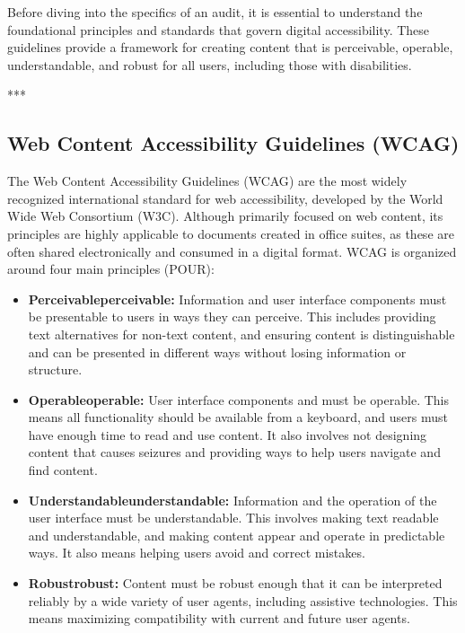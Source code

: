 Before diving into the specifics of an audit, it is essential to understand the foundational principles and standards that govern digital accessibility. These guidelines provide a framework for creating content that is perceivable, operable, understandable, and robust for all users, including those with disabilities.

***

\subsection{Web Content Accessibility Guidelines (WCAG)}
\label{sub:web-content-accessibility-guidelines-wcag}

The Web Content Accessibility Guidelines (\gls{WCAG}) are the most widely recognized international standard for web accessibility, developed by the World Wide Web Consortium (W3C). Although primarily focused on web content, its principles are highly applicable to documents created in office suites, as these are often shared electronically and consumed in a digital format. \gls{WCAG} is organized around four main principles (POUR)\supercite{WCAGGuidelines}:

\begin{itemize}
	\item \textbf{Perceivable\gls{perceivable}:} Information and user interface components must be presentable to users in ways they can perceive. This includes providing text alternatives for non-text content, and ensuring content is distinguishable and can be presented in different ways without losing information or structure.
	\item \textbf{Operable\gls{operable}:} User interface components and  must be operable. This means all functionality should be available from a keyboard, and users must have enough time to read and use content. It also involves not designing content that causes seizures and providing ways to help users navigate and find content.
	\item \textbf{Understandable\gls{understandable}:} Information and the operation of the user interface must be understandable. This involves making text readable and understandable, and making content appear and operate in predictable ways. It also means helping users avoid and correct mistakes.
	\item \textbf{Robust\gls{robust}:} Content must be robust enough that it can be interpreted reliably by a wide variety of user agents, including assistive technologies. This means maximizing compatibility with current and future user agents.
\end{itemize}

